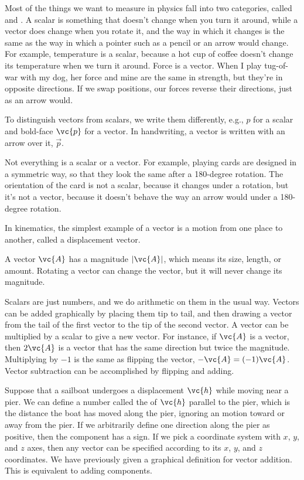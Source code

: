 Most of the things we want to measure in physics fall into two categories,
called  and .
A scalar is something
that doesn't change when you turn it around, while a vector does change
when you rotate it, and the way in which it changes is the same as the way
in which a pointer such as a pencil or an arrow would change. For example,
temperature is a scalar, because a hot cup of coffee doesn't change its temperature
when we turn it around. Force is a vector. When I play tug-of-war with my dog,
her force and mine are the same in strength, but they're in opposite directions.
If we swap positions, our forces reverse their directions, just as an arrow would.


To distinguish vectors from scalars, we write them differently, e.g., $p$ for a scalar
and bold-face $\vc{p}$ for a vector. In handwriting, a vector is written with an arrow
over it, $\overrightarrow{p}$.

Not everything is a scalar or a vector. For example, playing cards are designed
in a symmetric way, so that they look the same after a 180-degree rotation.
The orientation of the card is not a scalar, because it changes under a rotation,
but it's not a vector, because it doesn't behave the way an arrow would under a
180-degree rotation.

In kinematics, the simplest example of a vector is a motion from one place to another,
called a displacement vector.

A vector $\vc{A}$ has a magnitude $|\vc{A}|$, which means its size, length, or amount. Rotating a vector
can change the vector, but it will never change its magnitude.

Scalars are just numbers, and we do arithmetic on them in the usual
way.  Vectors can be added graphically by placing them tip to tail,
and then drawing a vector from the tail of the first vector to the tip
of the second vector. A vector can be multiplied by a scalar to give a new
vector. For instance, if $\vc{A}$ is a vector, then $2\vc{A}$ is a vector
that has the same direction but twice the magnitude. Multiplying by $-1$ is
the same as flipping the vector, $-\vc{A}=(-1)\vc{A}$. Vector subtraction can be
accomplished by flipping and adding.


Suppose that a sailboat undergoes a displacement $\vc{h}$ while moving near
a pier.
We can define a number called the  of $\vc{h}$ parallel to
the pier, which is the distance the boat has moved along the pier, ignoring
an motion toward or away from the pier. If we arbitrarily define one direction
along the pier as positive, then the component has a sign. If we pick a coordinate system
with $x$, $y$, and $z$ axes, then any vector can be specified according to its
$x$, $y$, and $z$ coordinates. We have previously given a graphical definition for
vector addition. This is equivalent to adding components.

